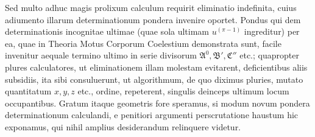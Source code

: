 Sed multo adhuc magis prolixum calculum requirit eliminatio indefinita, cuius adiumento illarum determinationum pondera invenire oportet. Pondus qui%
dem determinationis incognitae ultimae (quae sola ultimam \(u^{(\pi-1)}\) ingreditur) per ea, quae in Theoria Motus Corporum Coelestium demonstrata sunt, facile invenitur aequale termino ultimo in serie divisorum \(\mathfrak{A}^0,\mathfrak{B}',\mathfrak{C}''\) etc.; quapropter plures calculatores, ut eliminationem illam molestam evitarent, deficientibus aliis subsidiis, ita sibi consuluerunt, ut algorithmum, de quo diximus pluries, mutato quantitatum \(x,y,z\) etc., ordine, repeterent, singulis deinceps ultimum locum occupantibus. Gratum itaque geometris fore speramus, si modum novum pondera determinationum calculandi, e penitiori argumenti perscrutatione haustum hic exponamus, qui nihil amplius desiderandum relinquere videtur.

